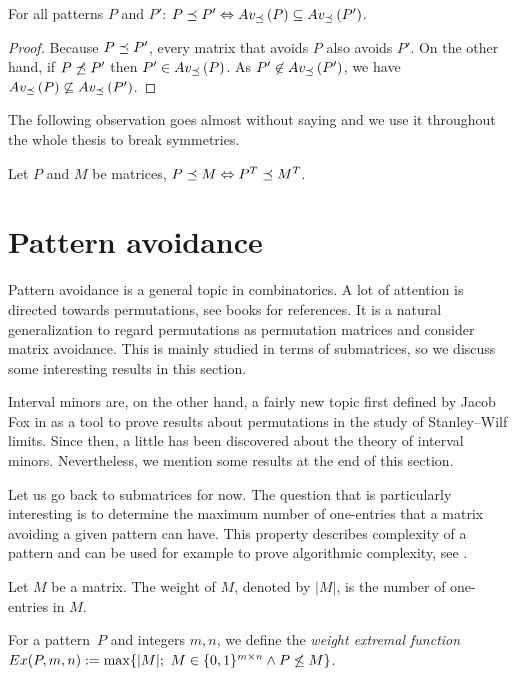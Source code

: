 \begin{obs}
\label{obs:im}
For all patterns $P$ and $P'$: $P\preceq P'\Leftrightarrow Av_{\preceq}\left(P\right)\subseteq Av_{\preceq}\left(P'\right)$.
\end{obs}
\begin{proof}
Because $P\preceq P'$, every matrix that avoids $P$ also avoids $P'$. On the other hand, if $P\not\preceq P'$ then $P'\in Av_{\preceq}\left(P\right)$. As $P'\not\in Av_{\preceq}\left(P'\right)$, we have $Av_{\preceq}\left(P\right)\not\subseteq Av_{\preceq}\left(P'\right)$.
\end{proof}

The following observation goes almost without saying and we use it throughout the whole thesis to break symmetries.

\begin{obs}
Let $P$ and $M$ be matrices, $P\preceq M\Leftrightarrow P^T\preceq M^T$.
\end{obs}

\section{Pattern avoidance}
Pattern avoidance is a general topic in combinatorics. A lot of attention is directed towards permutations, see books \cite{bona, kitaev} for references. It is a natural generalization to regard permutations as permutation matrices and consider matrix avoidance. This is mainly studied in terms of submatrices, so we discuss some interesting results in this section.

Interval minors are, on the other hand, a fairly new topic first defined by Jacob Fox in \cite{fox} as a tool to prove results about permutations in the study of Stanley--Wilf limits. Since then, a little has been discovered about the theory of interval minors. Nevertheless, we mention some results at the end of this section.

Let us go back to submatrices for now. The question that is particularly interesting is to determine the maximum number of one-entries that a matrix avoiding a given pattern can have. This property describes complexity of a pattern and can be used for example to prove algorithmic complexity, see \cite{efrat}.

\begin{defn}
Let $M$ be a matrix. The weight of $M$, denoted by $|M|$, is the number of one-entries in $M$.
\end{defn}

\begin{defn}
For a pattern~$P$ and integers $m,n$, we define the \emph{weight extremal function}~$Ex(P,m,n):=\max\{|M|;\ M\in\Mat\wedge\PnsmM\}$.
\end{defn}


